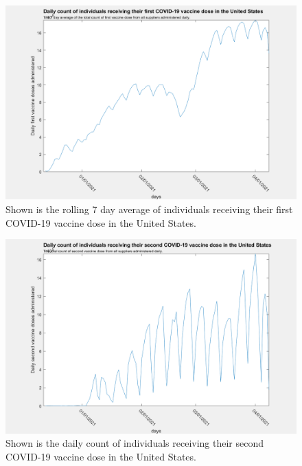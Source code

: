 \documentclass[twoside]{article}
\begin{document}
\begin{multicols}{2}
\begin{figure}[H]
	\includegraphics[width=\linewidth]{images/usa_daily_first_doses_processed.png}
	\caption{Shown is the rolling 7 day average of individuals receiving their first COVID-19 vaccine dose in the United States.}
	\label{fig:images/usa_daily_first_doses_processedLabel}
\end{figure}

\begin{figure}[H]
	\includegraphics[width=\linewidth]{images/usa_daily_second_doses_unprocessed.png}
	\caption{Shown is the daily count of individuals receiving their second COVID-19 vaccine dose in the United States.}
	\label{fig:images/usa_daily_second_doses_unprocessedLabel}
\end{figure}


\end{multicols}
\end{document}
